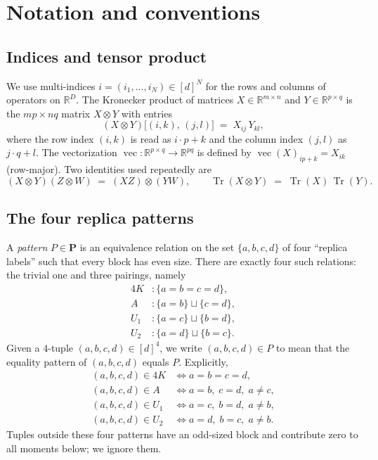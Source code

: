 \documentclass[11pt]{article}
\DeclareMathOperator{\Tr}{Tr}
\DeclareMathOperator{\vecop}{vec}
\newcommand{\IR}{\mathbb{R}}
\newcommand{\bP}{\boldsymbol{P}}
\begin{document}
\section{Notation and conventions}\label{sec:notation}

\subsection{Indices and tensor product}
We use multi-indices $i = (i_1,\dots,i_N)\in[d]^N$ for the rows and columns
of operators on $\IR^D$. The Kronecker product of matrices
$X\in\IR^{m\times n}$ and $Y\in\IR^{p\times q}$ is the
$mp\times nq$ matrix $X\otimes Y$ with entries
\[
(X\otimes Y)\bigl[(i,k),\,(j,l)\bigr] \;=\; X_{ij}\,Y_{kl},
\]
where the row index $(i,k)$ is read as $i\cdot p + k$ and the column index
$(j,l)$ as $j\cdot q + l$. The vectorization $\vecop:\IR^{p\times q}\to\IR^{pq}$
is defined by $\vecop(X)_{ip+k} = X_{ik}$ (row-major). Two identities used
repeatedly are
\begin{equation}\label{eq:kron-identities}
(X\otimes Y)(Z\otimes W) \;=\; (XZ)\otimes(YW),
\qquad
\Tr(X\otimes Y) \;=\; \Tr(X)\,\Tr(Y).
\end{equation}

\subsection{The four replica patterns}\label{def:patterns}
A \emph{pattern} $P\in\bP$ is an equivalence relation on the set
$\{a,b,c,d\}$ of four ``replica labels'' such that every block has even
size. There are exactly four such relations: the trivial one and three
pairings, namely
\begin{equation}\label{eq:patterns}
\begin{aligned}
4K  &: \{a=b=c=d\}, \\
A   &: \{a=b\}\sqcup\{c=d\}, \\
U_1 &: \{a=c\}\sqcup\{b=d\}, \\
U_2 &: \{a=d\}\sqcup\{b=c\}.
\end{aligned}
\end{equation}
Given a $4$-tuple $(a,b,c,d)\in[d]^4$, we write $(a,b,c,d)\in P$ to mean
that the equality pattern of $(a,b,c,d)$ equals $P$. Explicitly,
\[
\begin{aligned}
(a,b,c,d)\in 4K  &\iff a=b=c=d,\\
(a,b,c,d)\in A   &\iff a=b,\;c=d,\;a\ne c,\\
(a,b,c,d)\in U_1 &\iff a=c,\;b=d,\;a\ne b,\\
(a,b,c,d)\in U_2 &\iff a=d,\;b=c,\;a\ne b.
\end{aligned}
\]
Tuples outside these four patterns have an odd-sized block and contribute
zero to all moments below; we ignore them.
\end{document}
